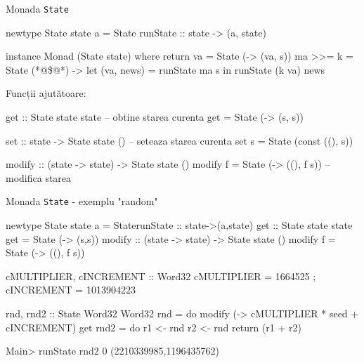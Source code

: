\documentclass[xcolor=x11names,compress,10pt]{beamer}
\newcommand{\li}[1]{\lstinline$#1$}
\begin{document}
\begin{frame}[fragile]{Monada \li{State}}


\begin{asciihs}
newtype State state a =
    State { runState :: state -> (a, state) }

instance Monad (State state) where
  return va = State (\s -> (va, s))  
  ma  >>= k =
      State (*@\$@*) \s -> let (va, news) = runState ma s
                            in runState (k va) news
\end{asciihs}

Funcții ajutătoare:

\begin{asciihs}
get :: State state state        -- obtine starea curenta
get = State (\s -> (s, s))

set :: state -> State state () -- seteaza starea curenta
set s = State (const ((), s))

modify :: (state -> state) -> State state ()
modify f = State (\s -> ((), f s))    -- modifica starea
\end{asciihs}
\end{frame}

\begin{frame}[fragile]{Monada \li{State} -  exemplu "random"}


\begin{asciihs}
newtype State state a = State{runState :: state->(a,state)}
get :: State state state
get = State (\s -> (s,s))
modify :: (state -> state) -> State state ()
modify f = State (\s -> ((), f s))
\end{asciihs}

\pause

\begin{asciihs}
cMULTIPLIER, cINCREMENT :: Word32
cMULTIPLIER = 1664525 ; cINCREMENT = 1013904223

rnd, rnd2 :: State Word32 Word32
rnd = do modify (\seed -> cMULTIPLIER * seed + cINCREMENT)
         get
rnd2 = do r1 <- rnd
          r2 <- rnd
          return (r1 + r2)

Main> runState rnd2 0 
(2210339985,1196435762)
\end{asciihs}
\end{frame}
\end{document}
